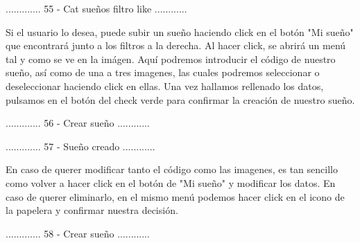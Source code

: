 ............. 55 - Cat sueños filtro like ............

Si el usuario lo desea, puede subir un sueño haciendo click en el botón "Mi sueño" que encontrará
junto a los filtros a la derecha. Al hacer click, se abrirá un menú tal y como se ve en la imágen.
Aquí podremos introducir el código de nuestro sueño, así como de una a tres imagenes, las cuales
podremos seleccionar o deseleccionar haciendo click en ellas. Una vez hallamos rellenado los datos,
pulsamos en el botón del check verde para confirmar la creación de nuestro sueño.

............. 56 - Crear sueño ............

............. 57 - Sueño creado ............

En caso de querer modificar tanto el código como las imagenes, es tan sencillo como volver a hacer
click en el botón de "Mi sueño" y modificar los datos. En caso de querer eliminarlo, en el mismo
menú podemos hacer click en el icono de la papelera y confirmar nuestra decisión.

............. 58 - Crear sueño ............